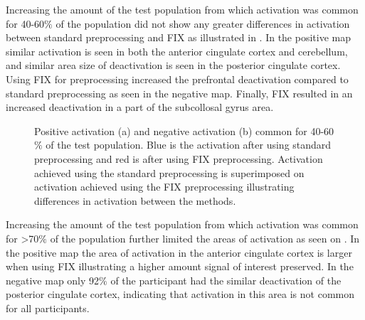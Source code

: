 Increasing the amount of the test population from which activation was common for 40-60$\percent$ of the population did not show any greater differences in activation between standard preprocessing and FIX as illustrated in . In the positive map similar activation is seen in both the anterior cingulate cortex and cerebellum, and similar area size of deactivation is seen in the posterior cingulate cortex. Using FIX for preprocessing increased the prefrontal deactivation compared to standard preprocessing as seen in the negative map. Finally, FIX resulted in an increased deactivation in a part of the subcollosal gyrus area.

\begin{figure}[H]%
	\centering
	\qquad
	\caption{Positive activation (a) and negative activation (b) common for 40-60$\percent$ of the test population. Blue is the activation after using standard preprocessing and red is after using FIX preprocessing. Activation achieved using the standard preprocessing is superimposed on activation achieved using the FIX preprocessing illustrating differences in activation between the methods.}
	\label{fig:40}
\end{figure}

Increasing the amount of the test population from which activation was common for >70$\%$ of the population further limited the areas of activation as seen on . In the positive map the area of activation in the anterior cingulate cortex is larger when using FIX illustrating a higher amount signal of interest preserved. In the negative map only 92$\percent$ of the participant had the similar deactivation of the posterior cingulate cortex, indicating that activation in this area is not common for all participants. 

